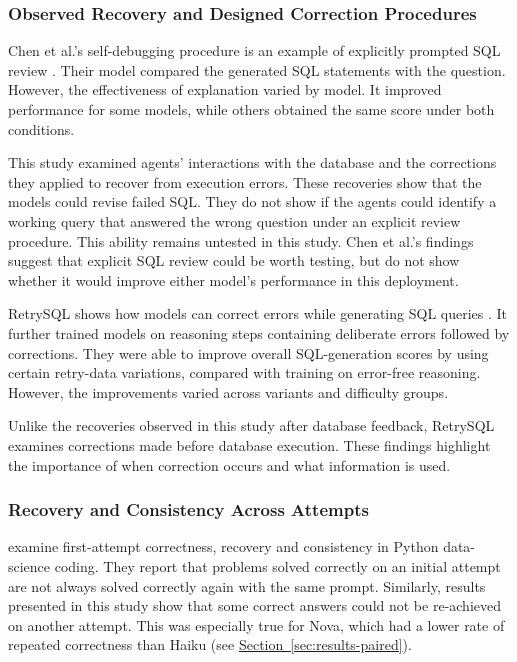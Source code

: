 \subsubsection{Observed Recovery and Designed Correction Procedures}

Chen et al.'s self-debugging procedure is an example of explicitly prompted SQL review \citep{chen2024selfdebug}.
Their model compared the generated SQL statements with the question.
However, the effectiveness of explanation varied by model.
It improved performance for some models,
while others obtained the same score under both conditions.

This study examined agents' interactions with the database
and the corrections they applied to recover from execution errors.
These recoveries show that the models could revise failed SQL.
They do not show if the agents could identify a working query
that answered the wrong question under an explicit review procedure.
This ability remains untested in this study.
Chen et al.'s findings suggest that explicit SQL review could be worth testing,
but do not show whether it would improve either model's performance in this deployment.

RetrySQL shows how models can correct errors while generating SQL queries \citep{raczkowska2026retrysql}.
It further trained models on reasoning steps
containing deliberate errors followed by corrections.
They were able to improve overall SQL-generation scores 
by using certain retry-data variations, compared with training on error-free reasoning.
However, the improvements varied across variants and difficulty groups.

Unlike the recoveries observed in this study after database feedback,
RetrySQL examines corrections made before database execution.
These findings highlight the importance of when correction occurs
and what information is used.

\subsubsection{Recovery and Consistency Across Attempts}

\citet{boominathan2026llm4ds} examine first-attempt correctness,
recovery and consistency in Python data-science coding.
They report that problems solved correctly on an initial attempt
are not always solved correctly again with the same prompt.
Similarly, results presented in this study show that some correct answers could not be re-achieved on another attempt. 
This was especially true for Nova, which had a lower rate of repeated correctness than Haiku
(see \hyperref[sec:results-paired]{Section~\ref*{sec:results-paired}}).


